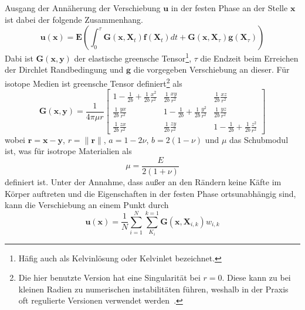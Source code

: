 Ausgang der Annäherung der Verschiebung $\boldsymbol{u}$ in der festen Phase an der Stelle $\boldsymbol{x}$ ist dabei der folgende Zusammenhang.
\begin{equation}
    \boldsymbol{u}(\boldsymbol{x}) = \boldsymbol{E} \left( \int_{0}^{\tau} \boldsymbol{G}(\boldsymbol{x},\boldsymbol{X}_t) \boldsymbol{f}(\boldsymbol{X}_t)dt + \boldsymbol{G}(\boldsymbol{x},\boldsymbol{X}_{\tau}) \boldsymbol{g}(\boldsymbol{X}_{\tau}) \right)
\end{equation}
Dabi ist $\boldsymbol{G}(\boldsymbol{x},\boldsymbol{y})$ der elastische greensche Tensor\footnote{Häfig auch als Kelvinlösung oder Kelvinlet bezeichnet.}, $\tau$ die Endzeit beim Erreichen der Dirchlet Randbedingung und $\boldsymbol{g}$ die vorgegeben Verschiebung an dieser. Für isotope Medien ist greensche Tensor definiert\footnote{Die hier benutzte Version hat eine Singularität bei $r=0$. Diese kann zu bei kleinen Radien zu numerischen instabilitäten führen, weshalb in der Praxis oft regulierte Versionen verwendet werden~\cite{DeGoes2017,Chen2022b,Ringel2024}.} als~\cite{Lazar2014,Chen2022b}
\begin{equation}
    \boldsymbol{G}(\boldsymbol{x}, \boldsymbol{y}) = \frac{1}{4\pi \mu r} \begin{bmatrix}
        1-\frac {1}{2b}+\frac {1}{2b}\frac {x^2}{r^2} & {\frac {1}{2b}}{\frac {xy}{r^{2}}} & {\frac {1}{2b}}{\frac {xz}{r^{2}}}\\
        {\frac {1}{2b}}{\frac {yx}{r^{2}}} & 1-{\frac {1}{2b}}+{\frac {1}{2b}}{\frac {y^{2}}{r^{2}}} & {\frac {1}{2b}}{\frac {yz}{r^{2}}}\\
        {\frac {1}{2b}}{\frac {zx}{r^{2}}} & {\frac {1}{2b}}{\frac {zy}{r^{2}}} & 1-{\frac {1}{2b}}+{\frac {1}{2b}}{\frac {z^{2}}{r^{2}}}
    \end{bmatrix}
\end{equation}
wobei $\boldsymbol{r} = \boldsymbol{x} - \boldsymbol{y}$, $r = \lVert \boldsymbol{r} \rVert$, $a = 1-2 \nu$, $b = 2(1-\nu)$ und $\mu$ das Schubmodul ist, was für isotrope Materialien als 
\begin{equation}
    \mu = \frac{E}{2(1+\nu)}
\end{equation} definiert ist.
Unter der Annahme, dass außer an den Rändern keine Käfte im Körper auftreten und die Eigenschaften in der festen Phase ortsunabhängig sind, kann die Verschiebung an einem Punkt durch 
\begin{equation}
    \boldsymbol{u}(\boldsymbol{x}) = \frac{1}{N} \sum_{i=1}^{N} \sum_{K_i}^{k=1} \boldsymbol{G}(\boldsymbol{x}, \boldsymbol{X}_{i,k}) w_{i,k}
\end{equation}
